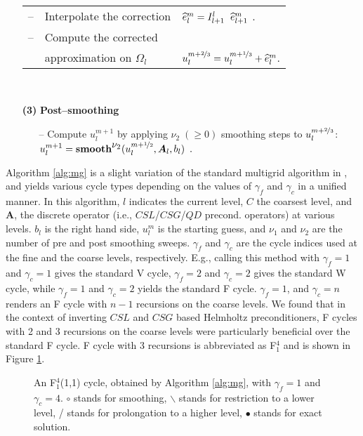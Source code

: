 \documentclass[mathpazo]{cicp}
\theoremstyle{definition}
\numberwithin{equation}{section}
\def\bsA{\boldsymbol{A}}
\begin{document}
\begin{algorithm}
\begin{enumerate}
\begin{tabular}{lll}
-- & \sf  Interpolate the correction \hspace*{8ex} 
      &$  \widehat{e}^m_l = I_{l+1}^l \hspace{2mm} \widehat{e}^m_{l+1}$ \enspace.\\[1.0ex]
-- & \sf  Compute the corrected \\
   & \sf  approximation on $\Omega_l$ 
                & $  u_l^{m+\nicefrac{2}{3}} = u^{m+\nicefrac{1}{3}}_l + \widehat{e}^m_l$\enspace.
\end{tabular}
\\
\item[\bf (3)]  \sf 
{\bf Post--smoothing}
\begin{itemize}
\item[--] \sf  Compute $u^{m+1}_l$ by applying $\nu_2\; (\ge \! 0)$ smoothing
        steps to $u_l^{m+\nicefrac{2}{3}}$:\\
$   u^{m+1}_l = {\rm \textbf{smooth}} ^{\normalsize\mbox{$\nu_2$}} 
    ( u_l^{m+\nicefrac{1}{2}} , \bsA_l, b_l) \enspace.
$
\end{itemize}
\end{enumerate} 
\end{algorithm}

Algorithm \ref{alg:mg} is a slight variation of the standard multigrid algorithm in \cite{Trot01}, 
and yields various cycle types depending on the values of $\gamma_f$ and $\gamma_c$ in a unified manner. 
In this algorithm, $l$ indicates the current level, $C$ the coarsest level, and $\bsA$, the discrete operator 
(i.e., $CSL$/$CSG$/$QD$ precond. operators) at various levels. $b_l$ is the right hand side, $u_l^m$ is the starting
 guess, and $\nu_1$ and $\nu_2$ are the number of pre and post smoothing sweeps. $\gamma_f$ and $\gamma_c$ are
 the cycle indices used at the fine and the coarse levels, respectively. E.g., calling this method with 
$\gamma_f=1$ and $\gamma_c=1$ gives the standard V cycle, $\gamma_f=2$ and $\gamma_c=2$ gives the standard W cycle, 
while $\gamma_f=1$ and $\gamma_c=2$ yields the standard F cycle. $\gamma_f=1$, and $\gamma_c=n$ renders an F cycle 
with $n-1$ recursions on the coarse levels. We found that in the context of inverting $CSL$ and $CSG$ based Helmholtz
preconditioners, F cycles with 2 and 3 recursions on the coarse levels were particularly beneficial over the 
standard F cycle. F cycle with 3 recursions is abbreviated as F$_1^4$ and is shown in Figure \ref{fig:F14_cyc}.

\begin{figure}
\centering
\caption{An F$_1^4$(1,1) cycle, obtained by Algorithm \ref{alg:mg}, with
 $\gamma_f=1$ and $\gamma_c=4$. $\circ$ stands for smoothing, $\backslash$ stands for
 restriction to a lower level, / stands for prolongation to a higher level, $\bullet$ stands for exact solution.}
\label{fig:F14_cyc}
\end{figure}
\end{document}
